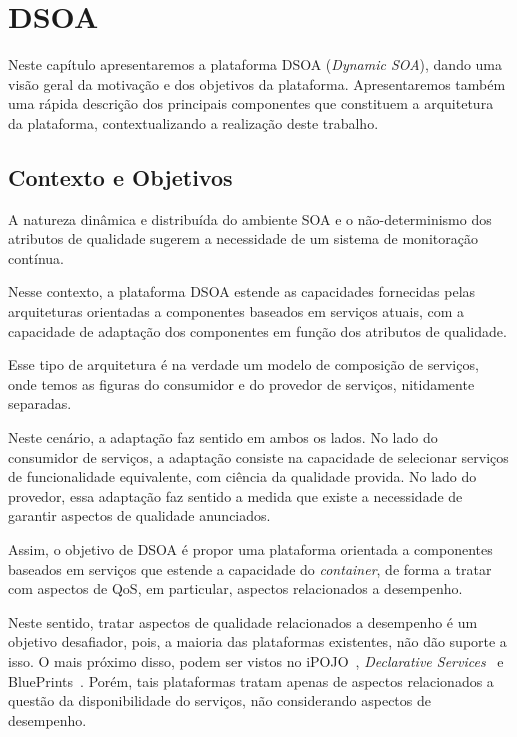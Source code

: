 \chapter{DSOA}
\label{ch:3}
Neste capítulo apresentaremos a plataforma DSOA (\textit{Dynamic SOA}), dando uma visão geral da motivação e dos objetivos da plataforma. Apresentaremos também uma rápida descrição dos principais componentes que constituem a arquitetura da plataforma, contextualizando a realização deste trabalho.

\section{Contexto e Objetivos}
\label{sec:dsoa_intro}

A natureza dinâmica e distribuída do ambiente SOA e o não-determinismo dos atributos de qualidade sugerem a necessidade de um sistema de monitoração contínua.

Nesse contexto, a plataforma DSOA estende as capacidades fornecidas pelas arquiteturas orientadas a componentes baseados em serviços atuais, com a capacidade de adaptação dos componentes em função dos atributos de qualidade. 

Esse tipo de arquitetura é na verdade um modelo de composição de serviços, onde temos as figuras do consumidor e do provedor de serviços, nitidamente separadas.

Neste cenário, a adaptação faz sentido em ambos os lados. No lado do consumidor de serviços, a adaptação consiste na capacidade de selecionar serviços de funcionalidade equivalente, com ciência da qualidade provida. No lado do provedor, essa adaptação faz sentido a medida que existe a necessidade de garantir aspectos de qualidade anunciados.

Assim, o objetivo de DSOA é propor uma plataforma orientada a componentes baseados em serviços que estende a capacidade do \textit{container}, de forma a tratar com aspectos de QoS, em particular, aspectos relacionados a desempenho.

Neste sentido, tratar aspectos de qualidade relacionados a desempenho é um objetivo desafiador, pois, a maioria das plataformas existentes, não dão suporte a isso. O mais próximo disso, podem ser vistos no iPOJO~\cite{ipojo}, \textit{Declarative Services}~\cite{declarative} e BluePrints~\cite{blueprint}. Porém, tais plataformas tratam apenas de aspectos relacionados a questão da disponibilidade do serviços, não considerando aspectos de desempenho.

